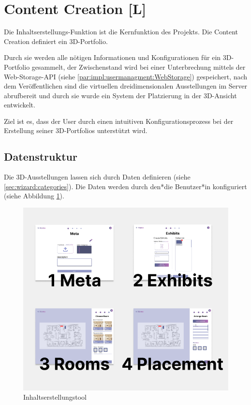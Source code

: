 \section{Content Creation [L]}
\label{content-creation}
Die Inhaltserstellungs-Funktion ist die Kernfunktion des Projekts. Die Content Creation definiert ein 3D-Portfolio. 

Durch sie werden alle nötigen Informationen und Konfigurationen für ein 3D-Portfolio gesammelt, der Zwischenstand wird bei einer Unterbrechung mittels der Web-Storage-API (siehe \ref{par:impl:usermanagment:WebStorage}) gespeichert, nach dem Veröffentlichen sind die virtuellen dreidimensionalen Ausstellungen im Server abrufbereit und durch sie wurde ein System der Platzierung in der 3D-Ansicht entwickelt.

Ziel ist es, dass der User durch einen intuitiven Konfigurationsprozess bei der Erstellung seiner 3D-Portfolios unterstützt wird.

\subsection{Datenstruktur}
Die 3D-Ausstellungen lassen sich durch Daten definieren (siehe \ref{sec:wizard:categories}). Die Daten werden durch den*die Benutzer*in konfiguriert (siehe Abbildung \ref{fig:impl:creation:fourCategoires}).

\begin{figure}[ht]
    \centering
    \includegraphics[scale=0.4]{pics/CreateCreation4Categories.png}
    \caption{Inhaltserstellungstool}
    \label{fig:impl:creation:fourCategoires}
\end{figure}

